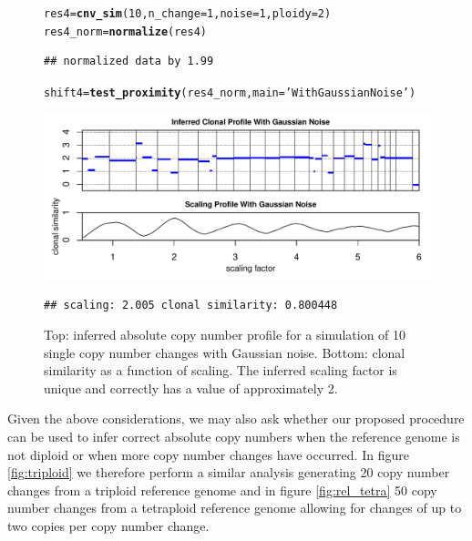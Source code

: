 \documentclass[12pt]{article}\usepackage[]{graphicx}\usepackage[]{color}
\makeatletter
\newcommand{\hlnum}[1]{\textcolor[rgb]{0.686,0.059,0.569}{#1}}%
\newcommand{\hlstr}[1]{\textcolor[rgb]{0.192,0.494,0.8}{#1}}%
\newcommand{\hlstd}[1]{\textcolor[rgb]{0.345,0.345,0.345}{#1}}%
\newcommand{\hlkwb}[1]{\textcolor[rgb]{0.69,0.353,0.396}{#1}}%
\newcommand{\hlkwc}[1]{\textcolor[rgb]{0.333,0.667,0.333}{#1}}%
\newcommand{\hlkwd}[1]{\textcolor[rgb]{0.737,0.353,0.396}{\textbf{#1}}}%
\newenvironment{kframe}{%
 \def\at@end@of@kframe{}%
 \ifinner\ifhmode%
  \def\at@end@of@kframe{\end{minipage}}%
  \begin{minipage}{\columnwidth}%
 \fi\fi%
 \def\FrameCommand##1{\hskip\@totalleftmargin \hskip-\fboxsep
 \colorbox{shadecolor}{##1}\hskip-\fboxsep
     \hskip-\linewidth \hskip-\@totalleftmargin \hskip\columnwidth}%
 \MakeFramed {\advance\hsize-\width
   \@totalleftmargin\z@ \linewidth\hsize
   \@setminipage}}%
 {\par\unskip\endMakeFramed%
 \at@end@of@kframe}
\newenvironment{knitrout}{}{} %
\makeatother
\begin{document}
\begin{figure}[h!]
  \centering
\begin{knitrout}
\color{fgcolor}\begin{kframe}
\begin{alltt}
\hlstd{res4} \hlkwb{=} \hlkwd{cnv_sim} \hlstd{(}\hlnum{10}\hlstd{,} \hlkwc{n_change} \hlstd{=} \hlnum{1}\hlstd{,} \hlkwc{noise} \hlstd{=} \hlnum{1}\hlstd{,} \hlkwc{ploidy}\hlstd{=}\hlnum{2}\hlstd{)}
\hlstd{res4_norm} \hlkwb{=} \hlkwd{normalize}\hlstd{(res4)}
\end{alltt}
\begin{verbatim}
## normalized data by 1.99
\end{verbatim}
\begin{alltt}
\hlstd{shift4} \hlkwb{=} \hlkwd{test_proximity}\hlstd{(res4_norm,} \hlkwc{main} \hlstd{=} \hlstr{'With Gaussian Noise'}\hlstd{)}
\end{alltt}
\end{kframe}
\includegraphics[width=.95\linewidth]{figure/unnamed-chunk-10-1} 
\begin{kframe}\begin{verbatim}
## scaling: 2.005 clonal similarity: 0.800448
\end{verbatim}
\end{kframe}
\end{knitrout}
\caption{Top: inferred absolute copy number profile for a simulation of 10 single copy number changes with Gaussian noise. Bottom: clonal similarity as a function of scaling. The inferred scaling factor is unique and correctly has a value of approximately 2.}
\label{fig:rel_noise}
\end{figure}

\newpage
Given the above considerations, we may also ask whether our proposed procedure can be used to infer correct absolute copy numbers when the reference genome is not diploid or when more copy number changes have occurred. In figure \ref{fig:triploid} we therefore perform a similar analysis generating 20 copy number changes from a triploid reference genome and in figure \ref{fig:rel_tetra} 50 copy number changes from a tetraploid reference genome allowing for changes of up to two copies per copy number change.
\end{document}
